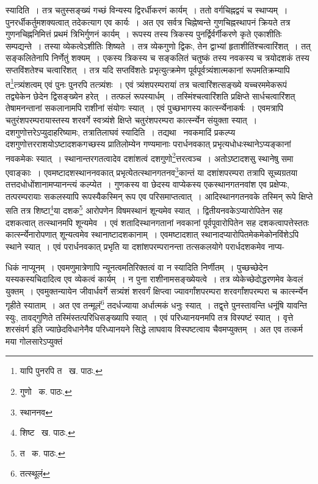 \documentclass[11pt, openany]{book}
\begin{document}
\noindent स्यादिति~। तत्र चतुस्सङ्ख्यं गच्छं विन्यस्य द्विरर्धीकरणं कार्यम्~। ततो वर्गचिह्नद्वयं च स्थाप्यम्~। पुनरर्धीकर्तुमशक्यत्वात् तदेकत्याग एव कार्यः~। अत एव सर्वत्र चिह्नेष्वन्ते गुणचिह्नस्थापनं क्रियते तत्र गुणनचिह्ननिमित्तं प्रथमं त्रिभिर्गुणनं कार्यम्~। रूपस्य तस्य त्रिकस्य
पुनर्द्विर्वर्गीकरणे कृते एकाशीतिः सम्पद्यन्ते~। तस्या व्येकत्वेऽशीतिः शिष्यते~। तत्र व्येकगुणो द्विकः, तेन द्वाभ्यां हृताशीतिंश्चत्वारिंशत्~। तत् सङ्कलितेनापि निर्णेतुं शक्यम्~। एकस्य त्रिकस्य च सङ्कलितं चतुष्कं तस्य नवकस्य च त्रयोदशकं तस्य सप्तविंशतेश्च चत्वारिंशत्~। तत्र यदि सप्तविंशतेः प्रभृत्युत्क्रमेण पूर्वपूर्वत्र्यंशात्मकानां रूपमतिक्रम्यापि त\renewcommand{\thefootnote}{१}\footnote{यापि पुनरपि त \textendash\ ख. पाठः.}त्त्र्यंशत्वम् एवं पुनः पुनरपि तत्त्र्यंशः~। एवं त्र्यंशपरम्परायां तत्र चत्वारिंशत्सङ्ख्ये यच्चरममेकरूपं तद्व्येकेन छेदेन द्विसङ्ख्येन हरेत्~। तत्फलं रूपस्यार्धम्~। तस्मिंश्चत्वारिंशति प्रक्षिप्ते सार्धचत्वारिंशत् तेषामनन्तानां सकलानामपि राशीनां संयोगः स्यात्~। एवं पुच्छभागस्य कार्त्स्न्येनाकर्षः~। एवमत्रापि चतुरंशपरम्परायास्तस्य शरवर्गे स्वत्र्यंशे क्षिप्ते चतुरंशपरम्परा कार्त्स्न्येन संयुक्ता स्यात्~। दशगुणोत्तरेऽप्युदाहरिष्यामः, तत्रातिलाघवं स्यादिति~। तद्यथा \textendash\ नवकमादिं प्रकल्प्य दशगुणोत्तरराशयोऽष्टादशकगच्छस्य प्रातिलोम्येन गण्यमानाः परार्धनवकात् प्रभृत्यधोधःस्थानेऽप्यङ्कानां नवकमेकः स्यात्~। स्थानान्तरगतत्वादेव दशांशत्वं दशगुणो\renewcommand{\thefootnote}{२}\footnote{गुणो \textendash\ क. पाठः.}त्तरत्वञ्च~। अतोऽष्टादशसु स्थानेषु समा एवाङ्काः~। एवमष्टादशस्थाननवकात् प्रभृत्येतत्स्थानगतनव\renewcommand{\thefootnote}{३}\footnote{स्थाननव}कान्तं या दशांशपरम्परा तत्रापि सूच्यग्रतया तत्तदधोधोंशानामप्यानन्त्यं कल्प्येत~। गुणकस्य वा छेदस्य वाप्येकस्य एकस्थानगतनवांश एव प्रक्षेप्यः, तत्परम्परायाः सकलस्यापि रूपस्यैकस्मिन् रूप एव परिसमाप्तत्वात्~। आदिस्थानगतनवके तस्मिन् रूपे क्षिप्ते सति तत्र शिष्टा\renewcommand{\thefootnote}{४}\footnote{शिष्ट \textendash\ ख. पाठः.}या दशक\renewcommand{\thefootnote}{५}\footnote{त \textendash\ क. पाठः.} आरोपणेन विषमस्थानं शून्यमेव स्यात्~। द्वितीयनवकेऽप्यारोपितेन सह दशकत्वात् तत्स्थानमपि शून्यमेव~। एवं शतादिस्थानगतानां नवकानां पूर्वपूवारोपितेन सह दशकत्वापत्तेस्ततः कार्त्स्न्येनारोपणात् शून्यत्वमेव स्थानाष्टादशकानाम्~। एवमष्टादशात् स्थानादप्यारोपितमेकमेकोनविंशेऽपि स्थाने स्यात्~। एवं परार्धनवकात् प्रभृति या दशांशपरम्परानन्ता तत्सकलयोगे परार्धदशकमेव नाप्य-

\newpage

\noindent धिकं नाप्यूनम्~। एवमणुमात्रेणापि न्यूनत्वमतिरिक्तत्वं वा न स्यादिति निर्णीतम्~। पुच्छच्छेदेन यस्यकस्यचिदादित्व एव व्येकत्वं कार्यम्~। न पुना राशीनामसङ्ख्येयत्वे~। तत्र व्येकेच्छेदोद्धरणमेव केवलं युक्तम्~। एवमुक्तन्यायेन जीवार्धवर्गे सत्र्यंशं शरवर्गं क्षिप्त्वा ज्यावर्गांशपरम्परा शरवर्गांशपरम्परा च कार्त्स्न्येन गृहीते स्याताम्~। अत एव तन्मूलं\renewcommand{\thefootnote}{१}\footnote{तत्स्थूलं} तदर्धज्याया अर्धात्मकं धनुः स्यात्~। तद्वृत्ते पुनस्तावन्ति धनूंषि यावन्ति स्युः, तावद्गुणिते तस्मिंस्तत्परिधिसङ्ख्यापि स्यात्~। एवं परिध्यानयनमपि तत्र विस्पष्टं स्यात्~। {\qt वृत्ते शरसंवर्ग} इति ज्याछेदविधानेनैव परिध्यानयने सिद्धे लाघवाय विस्पष्टत्वाय चैवमप्युक्तम्~। अत एव तत्कर्म मया गोलसारेऽप्युक्तं\textendash 
\end{document}
